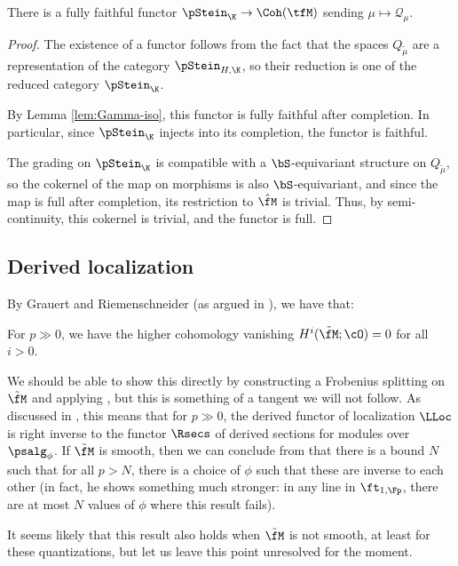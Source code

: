\begin{lemma}\label{lem:pStein-fully-faithful}
  There is a fully faithful functor $\pStein_\K\to \Coh(\tfM)$ sending $\mu\mapsto {\mathcal{Q}}_\mu$.  
\end{lemma}
\begin{proof}
  The existence of a functor follows from the fact that the spaces ${Q}_{\tilde{\mu}}$ are a representation of the category ${\pStein}_{H,\K}$, so their reduction is one of the reduced category ${\pStein}_{\K}$.  
  
  By Lemma \ref{lem:Gamma-iso}, this functor is fully faithful after completion.  In particular, since $\pStein_\K$ injects into its completion, the functor is faithful.
  
  The grading on ${\pStein}_{\K}$ is compatible with a $\bS$-equivariant structure on ${Q}_{\tilde{\mu}}$, so the cokernel of the map on morphisms is also $\bS$-equivariant, and since the map is full after completion, its restriction to $\hat{\fM}$ is trivial.  Thus, by semi-continuity, this cokernel is trivial, and the functor is full. 
\end{proof}

\subsection{Derived localization}
By  Grauert and Riemenschneider (as argued in \cite[Lemma 2.1]{Kal00}), we have that:
\begin{corollary}\label{cor:cohomology-vanishing}
For $p\gg 0$, we have the higher cohomology vanishing $H^i(\tilde{\fM};\cO)=0$ for all $i>0$.
\end{corollary}
We should be able to show this directly by constructing a Frobenius
splitting on $\tilde{\fM}$ and applying \cite{MR1156382}, but this is
something of a tangent we will not follow.
As discussed in \cite{KalDEQ}, this means that for $p\gg 0$, the
derived functor of localization $\LLoc$ is right inverse to the
functor  $\Rsecs$ of derived sections for modules over $\psalg_\phi$.  If $\tilde{\fM}$ is smooth, then we can conclude from \cite[Thm. 4.2]{KalDEQ} that there is a bound $N$ such that for all $p>N$, there is a choice of $\phi$ such that these are inverse to each other (in fact, he shows something much stronger: in any line in $\ft_{1,\Fp}$, there are at most $N$ values of $\phi$ where this result fails).  
\begin{remark}
It seems likely that this result also holds when $\tilde{\fM}$ is not smooth, at least for these quantizations, but let us leave this point unresolved for the moment.
\end{remark}





